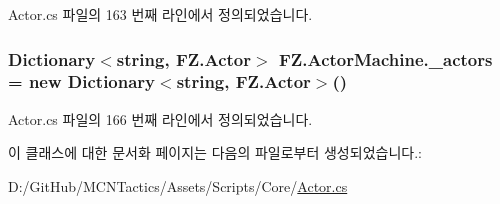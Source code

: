 Actor.\+cs 파일의 163 번째 라인에서 정의되었습니다.

\subsubsection[{\texorpdfstring{\+\_\+actors}{_actors}}]{\setlength{\rightskip}{0pt plus 5cm}Dictionary$<$string, {\bf F\+Z.\+Actor}$>$ F\+Z.\+Actor\+Machine.\+\_\+actors = new Dictionary$<$string, {\bf F\+Z.\+Actor}$>$()\hspace{0.3cm}{\ttfamily [private]}}\hypertarget{class_f_z_1_1_actor_machine_a4c843d618b443f77c4ff40286f03f6b5}{}\label{class_f_z_1_1_actor_machine_a4c843d618b443f77c4ff40286f03f6b5}


Actor.\+cs 파일의 166 번째 라인에서 정의되었습니다.



이 클래스에 대한 문서화 페이지는 다음의 파일로부터 생성되었습니다.\+:\begin{DoxyCompactItemize}
\item 
D\+:/\+Git\+Hub/\+M\+C\+N\+Tactics/\+Assets/\+Scripts/\+Core/\hyperlink{_actor_8cs}{Actor.\+cs}\end{DoxyCompactItemize}
